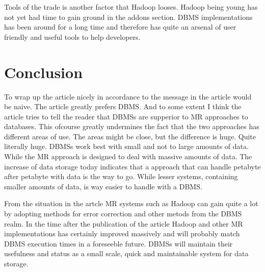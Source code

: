\documentclass[11pt, a4paper]{article}
\begin{document}
Tools of the trade is another factor that Hadoop looses. Hadoop being young has not yet had time to gain ground in the addons section. DBMS implementations has been around for a long time and therefore has quite an arsenal of user friendly and useful tools to help developers. 

\section{Conclusion}
To wrap up the article nicely in accordance to the message in the article would be naive. The article greatly prefers DBMS. 
And to some extent I think the article tries to tell the reader that DBMSs are supperior to MR approaches to databases. 
This ofcourse greatly undermines the fact that the two approaches has different areas of use. 
The areas might be close, but the difference is huge. Quite literally huge. DBMSs work best with small and not to large amounts of data. 
While the MR approach is designed to deal with massive amounts of data. 
The increase of data storage today indicates that a approach that can handle petabyte after petabyte with data is the way to go. 
While lesser systems, containing smaller amounts of data, is way easier to handle with a DBMS. 

From the situation in the artcle MR systems such as Hadoop can gain quite a lot by adopting methods for error correction and other metods from the DBMS realm. In the time after the publication of the article Hadoop and other MR implementations has certainly improved massively and will probably match DBMS execution times in a foreseeble future. 
DBMSs will maintain their usefulness and status as a small scale, quick and maintainable system for data storage. 
\end{document}
